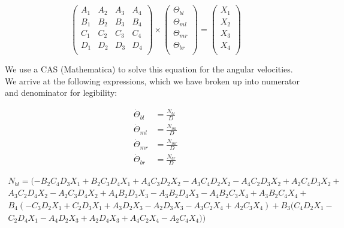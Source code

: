 \documentclass[11pt, landscape]{article}
\begin{document}
\begin{equation}
  \begin{pmatrix}
    A_1 & A_2 & A_3 & A_4 \\
    B_1 & B_2 & B_3 & B_4 \\
    C_1 & C_2 & C_3 & C_4 \\
    D_1 & D_2 & D_3 & D_4 \\    
  \end{pmatrix}
\times
  \begin{pmatrix}
    \Theta_{bl} \\
    \Theta_{ml} \\
    \Theta_{mr} \\
    \Theta_{br} \\
  \end{pmatrix}
=
  \begin{pmatrix}
    X_1 \\
    X_2 \\
    X_3 \\
    X_4 \\
  \end{pmatrix}
\end{equation}

We use a CAS (Mathematica) to solve this equation for the angular velocities. We arrive at the following expressions, which we have broken up into numerator and denominator for legibility:

\begin{align}
\dot{\Theta}_{bl} &= \frac{N_{bl}}{D} \\
\dot{\Theta}_{ml} &= \frac{N_{ml}}{D} \\
\dot{\Theta}_{mr} &= \frac{N_{mr}}{D} \\
\dot{\Theta}_{br} &= \frac{N_{br}}{D}
\end{align}

\begin{multline}
N_{bl} =
(-B_2 C_4 D_3 X_1 + B_2 C_3 D_4 X_1 + A_4 C_3 D_2 X_2 - A_3 C_4 D_2 X_2 - A_4 C_2 D_3 X_2 + A_2 C_4 D_3 X_2 +\\
 A_3 C_2 D_4 X_2 - A_2 C_3 D_4 X_2 + A_4 B_2 D_3 X_3 - A_3 B_2 D_4 X_3 - A_4 B_2 C_3 X_4 + A_3 B_2 C_4 X_4 +\\
B_4 (-C_3 D_2 X_1 + C_2 D_3 X_1 + A_3 D_2 X_3 - A_2 D_3 X_3 - A_3 C_2 X_4 + A_2 C_3 X_4) + B_3 (C_4 D_2 X_1 - \\
C_2 D_4 X_1 - A_4 D_2 X_3 + A_2 D_4 X_3 + A_4 C_2 X_4 - A_2 C_4 X_4)) \\
\end{multline}
\end{document}
